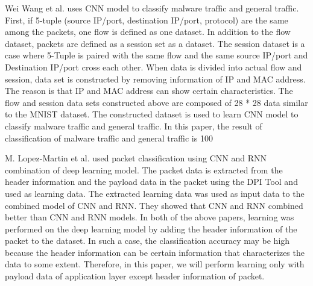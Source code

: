 Wei Wang et al. uses CNN model to classify malware traffic and general traffic.
First, if 5-tuple (source IP/port, destination IP/port, protocol) are the same among the packets, one flow is defined as one dataset.
In addition to the flow dataset, packets are defined as a session set as a dataset.
The session dataset is a case where 5-Tuple is paired with the same flow and the same source IP/port and Destination IP/port cross each other.
When data is divided into actual flow and session, data set is constructed by removing information of IP and MAC address.
The reason is that IP and MAC address can show certain characteristics.
The flow and session data sets constructed above are composed of 28 * 28 data similar to the MNIST dataset.
The constructed dataset is used to learn CNN model to classify malware traffic and general traffic.
In this paper, the result of classification of malware traffic and general traffic is 100%

M. Lopez-Martin et al. used packet classification using CNN and RNN combination of deep learning model. The packet data is extracted from the header information and the payload data in the packet using the DPI Tool and used as learning data. The extracted learning data was used as input data to the combined model of CNN and RNN. They showed that CNN and RNN combined better than CNN and RNN models.
In both of the above papers, learning was performed on the deep learning model by adding the header information of the packet to the dataset. In such a case, the classification accuracy may be high because the header information can be certain information that characterizes the data to some extent. Therefore, in this paper, we will perform learning only with payload data of application layer except header information of packet.
